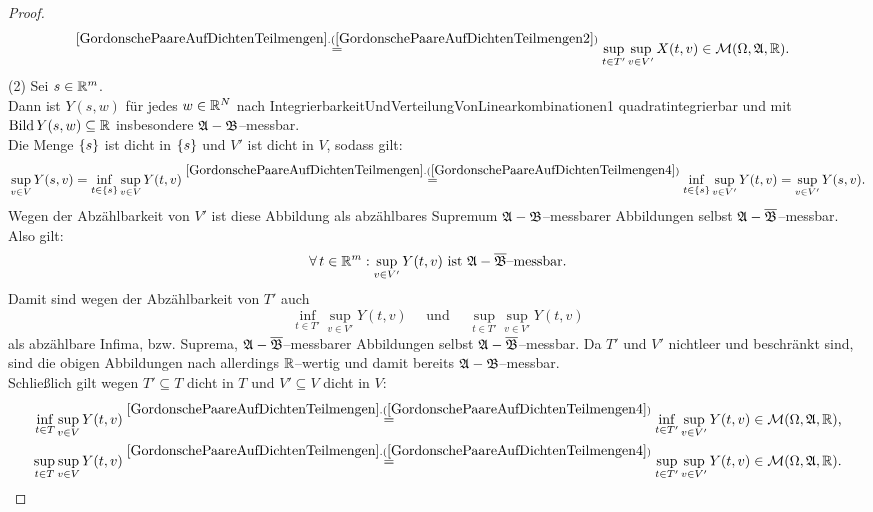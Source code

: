 \begin{proof}
\begin{align*}
&\overset{\refclaim{GordonschePaareAufDichtenTeilmengen}
{GordonschePaareAufDichtenTeilmengen2}}=
 \sup_{t \in T'}\sup_{v \in V'}X(t,v) \in \mcm(\Omega, \mfa, \R)\text.
\end{align*}
(2) Sei $s \in \mathbb{R}^m$.\\
Dann ist $Y(s, w)$ für jedes $w \in \mathbb{R}^N$ nach
{IntegrierbarkeitUndVerteilungVonLinearkombinationen1} quadratintegrierbar und
mit $\mathop{\textrm{Bild}}\nolimits Y(s, w) \subseteq \mathbb{R}$ insbesondere $\mathfrak{A}-\mathfrak{B}$--messbar.\\
Die Menge $\left\{s\right\}$ ist dicht in $\left\{s\right\}$ und $V'$ ist dicht in $V$, sodass
gilt:
\[\sup_{v \in V} Y (s, v) = \inf_{t \in \meng s}\sup_{v \in V}Y(t,v)
\overset{\refclaim{GordonschePaareAufDichtenTeilmengen}
{GordonschePaareAufDichtenTeilmengen4}}=
\inf_{t \in \meng s}\sup_{v \in V'}Y(t,v) = \sup_{v \in V'}Y(s,v)\text.\]
Wegen der Abzählbarkeit von $V'$ ist diese Abbildung als abzählbares Supremum
$\mathfrak{A}-\mathfrak{B}$--messbarer Abbildungen selbst $\mathfrak{A}-\overline{\mathfrak{B}}$--messbar.\\
Also gilt:\[
\forall\,t\in\mathbb{R}^m:\sup_{v\in V'}Y(t,v)\text{ ist } \mathfrak{A}-\overline{\mathfrak{B}}
\text{--messbar.}\]
Damit sind wegen der Abzählbarkeit von $T'$ auch 
\[\inf_{t \in T'}\sup_{v\in V'}Y(t, v)
 \quad \text{ und }\quad 
  \sup_{t \in T'}\sup_{v\in V'}Y(t, v)\]
als abzählbare Infima, bzw. Suprema, $\mathfrak{A}-\overline{\mathfrak{B}}$--messbarer
Abbildungen selbst $\mathfrak{A}-\overline{\mathfrak{B}}$--messbar.
Da $T'$ und $V'$ nichtleer und beschränkt sind, sind die obigen Abbildungen
nach
 allerdings $\mathbb{R}$--wertig und damit bereits
$\mathfrak{A}-\mathfrak{B}$--messbar.\\
Schließlich gilt wegen $T'\subseteq T$ dicht in $T$ und $V'\subseteq V$ dicht
in $V$:
\begin{align*}
\inf_{t \in T}\sup_{v \in V}Y(t, v)
&\overset{\refclaim{GordonschePaareAufDichtenTeilmengen}
{GordonschePaareAufDichtenTeilmengen4}}=
\inf_{t \in T'}\sup_{v\in V'}Y(t, v) \in \mcm(\Omega, \mfa, \R)\text,\\
\sup_{t \in T}\sup_{v \in V}Y(t, v)
&\overset{\refclaim{GordonschePaareAufDichtenTeilmengen}
{GordonschePaareAufDichtenTeilmengen4}}=
\sup_{t \in T'}\sup_{v\in V'}Y(t, v) \in \mcm(\Omega, \mfa, \R)\text.
\end{align*}
\end{proof}
    